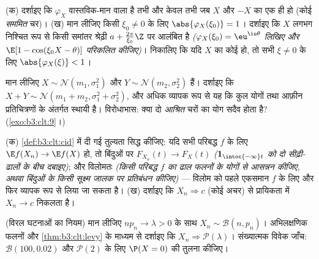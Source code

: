 \begin{exercise}[$\star\star$]\label{exo:b3:clt:2}
(क) दर्शाइए कि $\varphi_X$ वास्तविक-मान वाला है तभी और केवल तभी जब $X$
और $-X$ का  एक ही हो (कोई \emph{सममित} चर)।
(ख) मान लीजिए किसी $\xi_0 \neq
0$ के लिए $\abs{\varphi_X(\xi_0)} = 1$। दर्शाइए कि $X$ लगभग निश्चित
रूप से किसी समांतर श्रेढ़ी $a + \frac{2\pi}{\xi_0}\Z$ पर आलंबित है \emph{($\varphi_X(\xi_0) = \eu^{\iu\theta}$ लिखिए
और $\E[1 -
\cos(\xi_0X - \theta)]$ परिकलित कीजिए)}। निकालिए कि यदि $X$ का कोई  हो, तो
सभी $\xi \neq 0$ के लिए $\abs{\varphi_X(\xi)} < 1$।
\end{exercise}

\begin{exercise}[$\star\star$]\label{exo:b3:clt:3}
मान लीजिए $X \sim \mathcal N(m_1, \sigma_1^2)$ और $Y \sim
\mathcal N(m_2, \sigma_2^2)$  हैं। दर्शाइए कि $X + Y
\sim \mathcal N(m_1 + m_2, \sigma_1^2 + \sigma_2^2)$, और अधिक
व्यापक रूप से यह कि  कुल  योगों तथा आफ़ीन प्रतिचित्रणों
के अंतर्गत स्थायी है। विरोधाभास: क्या दो \emph{आश्रित}  चरों
का योग सदैव  होता है? (\cref{exo:b3:clt:9}।)
\end{exercise}

\begin{exercise}[$\star\star$]\label{exo:b3:clt:4}
(क) \cref{def:b3:clt:cid} में दी गई तुल्यता सिद्ध कीजिए: यदि सभी परिबद्ध  $f$
के लिए $\E f(X_n) \to \E f(X)$ हो, तो  बिंदुओं पर $F_{X_n}(t) \to F_X(t)$ \emph{($\mathbf 1_{\intoc{-\infty}t}$ को दो
 सीढ़ी-ढालों के बीच दबाइए)}; और विलोमतः \emph{(किसी परिबद्ध
 $f$ का ढाल फलनों के योगों से आसन्नन कीजिए, अथवा 
बिंदुओं के किसी सूक्ष्म जालक पर प्रतिबंधन कीजिए)} --- विलोम को पहले
एकसमान  $f$ के लिए और फिर व्यापक रूप से लिया जा सकता है।
(ख) दर्शाइए कि $X_n \Rightarrow c$ (कोई अचर) से प्रायिकता में $X_n
\to c$ निकलता है।
\end{exercise}

\begin{exercise}[$\star\star$]\label{exo:b3:clt:5}
(विरल घटनाओं का नियम) मान लीजिए $np_n \to \lambda > 0$ के साथ $X_n \sim \mathcal B(n, p_n)$। अभिलक्षणिक
फलनों और \cref{thm:b3:clt:levy} के माध्यम से दर्शाइए कि $X_n \Rightarrow \mathcal
P(\lambda)$। संख्यात्मक विवेक
जाँच: $\mathcal B(100, 0.02)$ और $\mathcal P(2)$ के लिए $\P(X = 0)$ की तुलना कीजिए।
\end{exercise}

